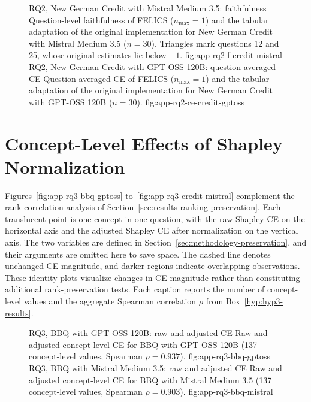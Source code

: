 \begin{figure}[H]
  \centering
    {RQ2, New German Credit with Mistral Medium 3.5: faithfulness}%
    {Question-level faithfulness of FELICS ($n_{\max}=1$) and the tabular adaptation of the original implementation for New German Credit with Mistral Medium 3.5 ($n=30$). Triangles mark questions 12 and 25, whose original estimates lie below $-1$.}%
    {fig:app-rq2-f-credit-mistral}%
  \hfill
    {RQ2, New German Credit with GPT-OSS 120B: question-averaged CE}%
    {Question-averaged CE of FELICS ($n_{\max}=1$) and the tabular adaptation of the original implementation for New German Credit with GPT-OSS 120B ($n=30$).}%
    {fig:app-rq2-ce-credit-gptoss}%
\end{figure}

\section{Concept-Level Effects of Shapley Normalization}
\label{app:rq3-normalization-identity}

Figures~\ref{fig:app-rq3-bbq-gptoss} to~\ref{fig:app-rq3-credit-mistral} complement the rank-correlation analysis of Section~\ref{sec:results-ranking-preservation}. Each translucent point is one concept in one question, with the raw Shapley CE on the horizontal axis and the adjusted Shapley CE after normalization on the vertical axis. The two variables are defined in Section~\ref{sec:methodology-preservation}, and their arguments are omitted here to save space. The dashed line denotes unchanged CE magnitude, and darker regions indicate overlapping observations. These identity plots visualize changes in CE magnitude rather than constituting additional rank-preservation tests. Each caption reports the number of concept-level values and the aggregate Spearman correlation $\rho$ from Box~\ref{hyp:hyp3-results}.

\begin{figure}[H]
  \centering
    {RQ3, BBQ with GPT-OSS 120B: raw and adjusted CE}%
    {Raw and adjusted concept-level CE for BBQ with GPT-OSS 120B (137 concept-level values, Spearman $\rho=0.937$).}%
    {fig:app-rq3-bbq-gptoss}%
  \hfill
    {RQ3, BBQ with Mistral Medium 3.5: raw and adjusted CE}%
    {Raw and adjusted concept-level CE for BBQ with Mistral Medium 3.5 (137 concept-level values, Spearman $\rho=0.903$).}%
    {fig:app-rq3-bbq-mistral}%
\end{figure}

